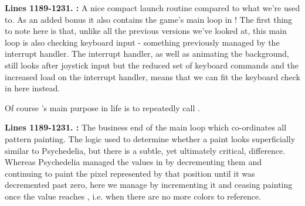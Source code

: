 \textbf{Lines 1189-1231. :} A nice compact launch routine compared to what we're used to. As an added
bonus it also contains the game's main loop in ! The first thing to note here is that, unlike all the previous
versions we've looked at, this main loop is also checking keyboard input - something previously managed by the interrupt handler. The
interrupt handler, as well as animating the background, still looks after joystick input but the reduced set of keyboard commands and
the increased load on the interrupt handler, means that we can fit the keyboard check in here instead.

Of course 's main purpose in life is to repeatedly call .

\bigskip
\bigskip
\bigskip
\bigskip
\bigskip

\textbf{Lines 1189-1231. :} The business end of the main loop which co-ordinates
all pattern painting. The logic used to determine whether a paint looks superficially similar to Psychedelia, but there is
a subtle, yet ultimately critical, difference. Whereas Psychedelia managed the values 
in by decrementing them and continuing to paint the pixel represented by that
position until it was decremented past zero, here we manage  by incrementing
it and ceasing painting once the value reaches , i.e. when there are no more colors to reference.


